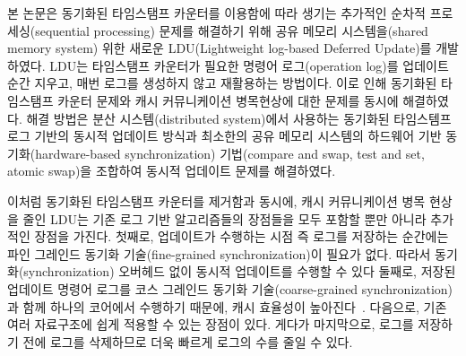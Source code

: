%
본 논문은 동기화된 타임스탬프 카운터를 이용함에 따라 생기는 추가적인 순차적 프로세싱(sequential processing) 문제를
해결하기 위해 공유 메모리 시스템을(shared memory system) 위한 새로운 LDU(Lightweight log-based
Deferred Update)를 개발하였다.
LDU는 타임스탬프 카운터가 필요한 명령어 로그(operation log)를 업데이트 순간 지우고,
 매번 로그를 생성하지 않고 재활용하는 방법이다.
이로 인해 동기화된 타임스탬프 카운터 문제와 캐시 커뮤니케이션 병목현상에 대한 문제를 동시에 해결하였다.
해결 방법은 분산 시스템(distributed system)에서 사용하는 동기화된 타임스템프 로그 기반의 
동시적 업데이트 방식과 최소한의 공유 메모리 시스템의 하드웨어 기반 동기화(hardware-based
synchronization) 기법(compare and swap, test and set, atomic swap)을 조합하여 동시적 업데이트
문제를 해결하였다.

이처럼 동기화된 타임스탬프 카운터를 제거함과 동시에, 캐시 커뮤니케이션 병목 현상을 줄인
LDU는 기존 로그 기반 알고리즘들의 장점들을 모두 포함할 뿐만 아니라 추가적인 장점을 가진다.
첫째로, 업데이트가 수행하는 시점 즉 로그를 저장하는 순간에는
 파인 그레인드 동기화 기술(fine-grained synchronization)이 필요가 없다.
따라서 동기화(synchronization) 오버헤드 없이 동시적 업데이트를 수행할 수 있다
둘째로, 저장된 업데이트 명령어 로그를 코스 그레인드 동기화 기술(coarse-grained synchronization)과 함께 하나의
코어에서 수행하기 때문에, 캐시 효율성이 높아진다~\cite{Hendler2010FC}.
다음으로, 기존 여러 자료구조에 쉽게 적용할 수 있는 장점이 있다.
게다가 마지막으로, 로그를 저장하기 전에 로그를 삭제하므로 더욱 빠르게 로그의 수를 줄일 수 있다. 


